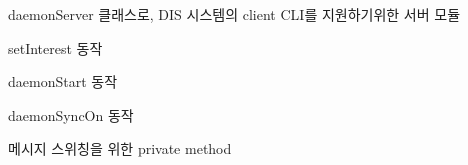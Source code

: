 \documentclass[a4paper,10pt,english]{sphinxmanual}
\begin{document}
\begin{fulllineitems}
\label{\detokenize{_daemonServer:dServer}}
\pysigstartsignatures
{}
\pysigstopsignatures
\sphinxAtStartPar
daemonServer 클래스로, DIS 시스템의 client CLI를 지원하기위한 서버 모듈

\begin{fulllineitems}
\label{\detokenize{_daemonServer:dServer._dmSetInterest}}
\pysigstartsignatures
{}
\pysigstopsignatures
\sphinxAtStartPar
setInterest 동작

\end{fulllineitems}


\begin{fulllineitems}
\label{\detokenize{_daemonServer:dServer._dmStart}}
\pysigstartsignatures
{}
\pysigstopsignatures
\sphinxAtStartPar
daemonStart 동작

\end{fulllineitems}


\begin{fulllineitems}
\label{\detokenize{_daemonServer:dServer._dmSyncOn}}
\pysigstartsignatures
{}
\pysigstopsignatures
\sphinxAtStartPar
daemonSyncOn 동작

\end{fulllineitems}


\begin{fulllineitems}
\label{\detokenize{_daemonServer:dServer._parentSwitch}}
\pysigstartsignatures
{}
\pysigstopsignatures
\sphinxAtStartPar
메시지 스위칭을 위한 private method


\end{fulllineitems}
\end{fulllineitems}
\end{document}
